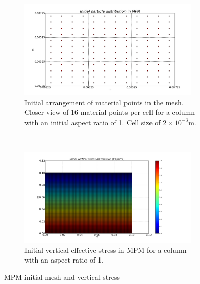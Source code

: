 \begin{figure}[tbhp]
\centering
\begin{subfigure}[b]{0.95\textwidth}
\centering
\includegraphics[width=0.95\textwidth]{ini_mesh_mpm_column}
\caption{Initial arrangement of material points in the mesh. Closer view of 
16 material points per cell for a column with an initial aspect ratio of 1. 
Cell size of $2\times10^{-3}\si{\m}$.}
\label{fig:ini_mesh_mpm_column}
\end{subfigure}
\\
\begin{subfigure}[b]{0.95\textwidth}
\centering
\includegraphics[width=0.95\textwidth]{ini_stress_mpm_column}
\caption{Initial vertical effective stress in MPM for a column with an aspect 
ratio of 1.}
\label{fig:ini_stress_mpm_column}
\end{subfigure}
\caption{MPM initial mesh and vertical stress}
\label{fig:MPM_Sample}
\end{figure}



